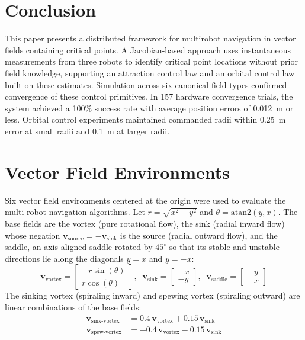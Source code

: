 \documentclass[lettersize,journal]{IEEEtran}
\begin{document}
\section{Conclusion}
\noindent

This paper presents a distributed framework for multirobot navigation in vector fields containing critical points. A Jacobian-based approach uses instantaneous measurements from three robots to identify critical point locations without prior field knowledge, supporting an attraction control law and an orbital control law built on these estimates. Simulation across six canonical field types confirmed convergence of these control primitives. In 157 hardware convergence trials, the system achieved a 100\% success rate with average position errors of 0.012~m or less. Orbital control experiments maintained commanded radii within 0.25~m error at small radii and 0.1~m at larger radii.


\appendices

\section{Vector Field Environments}
\label{sec:appendix_vector_fields}

Six vector field environments centered at the origin were used to evaluate the multi-robot navigation algorithms. Let $r = \sqrt{x^2 + y^2}$ and $\theta = \text{atan2}(y, x)$. The base fields are the vortex (pure rotational flow), the sink (radial inward flow) whose negation $\mathbf{v}_{\text{source}} = -\mathbf{v}_{\text{sink}}$ is the source (radial outward flow), and the saddle, an axis-aligned saddle rotated by $45^\circ$ so that its stable and unstable directions lie along the diagonals $y = x$ and $y = -x$:
\begin{equation}\label{eq:14}
\mathbf{v}_{\text{vortex}} = \begin{bmatrix} -r \sin(\theta) \\ r \cos(\theta) \end{bmatrix}, \;\;
\mathbf{v}_{\text{sink}} = \begin{bmatrix} -x \\ -y \end{bmatrix}, \;\;
\mathbf{v}_{\text{saddle}} = \begin{bmatrix} -y \\ -x \end{bmatrix}
\end{equation}
The sinking vortex (spiraling inward) and spewing vortex (spiraling outward) are linear combinations of the base fields:
\begin{equation}\label{eq:15}
\begin{aligned}
\mathbf{v}_{\text{sink-vortex}} &= 0.4\,\mathbf{v}_{\text{vortex}} + 0.15\,\mathbf{v}_{\text{sink}} \\
\mathbf{v}_{\text{spew-vortex}} &= -0.4\,\mathbf{v}_{\text{vortex}} - 0.15\,\mathbf{v}_{\text{sink}}
\end{aligned}
\end{equation}
\end{document}
